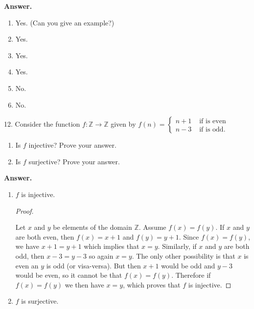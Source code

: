 \documentclass[10pt,]{book}
\theoremstyle{plain}
\theoremstyle{definition}
\theoremstyle{definition}
\theoremstyle{definition}
\numberwithin{equation}{section}
\def\Z{\mathbb Z}
\newcommand{\amp}{ & }
\begin{document}
\begin{exerciselist}
\par\smallskip
\par\smallskip
\noindent\textbf{Answer.}\hypertarget{answer-27}{}\quad
\leavevmode%
\begin{enumerate}[label=(\alph*)]
\item\hypertarget{li-241}{}
Yes. (Can you give an example?)
%
\item\hypertarget{li-242}{}
Yes.
%
\item\hypertarget{li-243}{}
Yes.
%
\item\hypertarget{li-244}{}
Yes.
%
\item\hypertarget{li-245}{}
No.
%
\item\hypertarget{li-246}{}
No.
%
\end{enumerate}
\item[12.]\hypertarget{exercise-28}{}
Consider the function \(f:\Z \to \Z\) given by \(f(n) = \begin{cases}n+1 \amp  \mbox{ if  is even} \\
                                                                 n-3 \amp  \mbox{ if  is odd} .
\end{cases}\)
%
\leavevmode%
\begin{enumerate}[label=(\alph*)]
\item\hypertarget{li-247}{}
Is \(f\) injective?  Prove your answer.
%
\item\hypertarget{li-248}{}
Is \(f\) surjective?  Prove your answer.
%
\end{enumerate}
\par\smallskip
\par\smallskip
\noindent\textbf{Answer.}\hypertarget{answer-28}{}\quad
\leavevmode%
\begin{enumerate}[label=(\alph*)]
\item\hypertarget{li-249}{}\(f\) is injective.

\begin{proof}\hypertarget{proof-1}{}

Let \(x\) and \(y\) be elements of the domain \(\Z\). Assume \(f(x) = f(y)\). If \(x\) and \(y\) are both even, then \(f(x) = x+1\) and \(f(y) = y+1\). Since \(f(x) = f(y)\), we have \(x + 1 = y + 1\) which implies that \(x = y\). Similarly, if \(x\) and \(y\) are both odd, then \(x - 3 = y-3\) so again \(x = y\). The only other possibility is that \(x\) is even an \(y\) is odd (or visa-versa). But then \(x + 1\) would be odd and \(y - 3\) would be even, so it cannot be that \(f(x) = f(y)\). Therefore if \(f(x) = f(y)\) we then have \(x = y\), which proves that \(f\) is injective.
%
\end{proof}
\item\hypertarget{li-250}{}\(f\) is surjective.


\end{enumerate}
\end{exerciselist}
\end{document}
